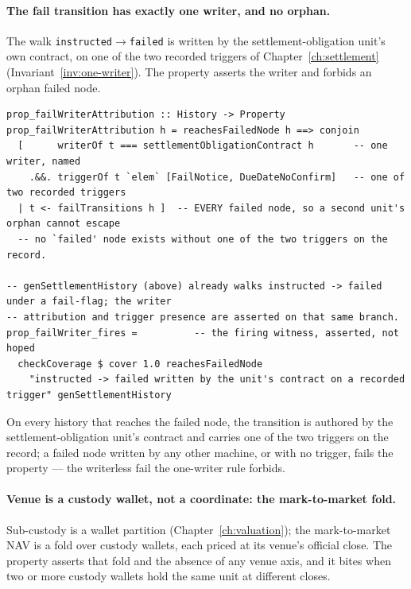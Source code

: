 \documentclass[11pt,a4paper]{article}
\begin{document}
\paragraph{The fail transition has exactly one writer, and no orphan.}
The walk \texttt{instructed}$\to$\texttt{failed} is written by the settlement-obligation unit's
own contract, on one of the two recorded triggers of Chapter~\ref{ch:settlement}
(Invariant~\ref{inv:one-writer}). The property asserts the writer and forbids an orphan
failed node.

\begin{lstlisting}
prop_failWriterAttribution :: History -> Property
prop_failWriterAttribution h = reachesFailedNode h ==> conjoin
  [      writerOf t === settlementObligationContract h       -- one writer, named
    .&&. triggerOf t `elem` [FailNotice, DueDateNoConfirm]   -- one of two recorded triggers
  | t <- failTransitions h ]  -- EVERY failed node, so a second unit's orphan cannot escape
  -- no `failed' node exists without one of the two triggers on the record.

-- genSettlementHistory (above) already walks instructed -> failed under a fail-flag; the writer
-- attribution and trigger presence are asserted on that same branch.
prop_failWriter_fires =          -- the firing witness, asserted, not hoped
  checkCoverage $ cover 1.0 reachesFailedNode
    "instructed -> failed written by the unit's contract on a recorded trigger" genSettlementHistory
\end{lstlisting}

On every history that reaches the failed node, the transition is authored by the
settlement-obligation unit's contract and carries one of the two triggers on the record; a failed
node written by any other machine, or with no trigger, fails the property --- the writerless fail the
one-writer rule forbids.

\paragraph{Venue is a custody wallet, not a coordinate: the mark-to-market fold.}
Sub-custody is a wallet partition (Chapter~\ref{ch:valuation}); the mark-to-market NAV is a
fold over custody wallets, each priced at its venue's official close. The property asserts
that fold and the absence of any venue axis, and it bites when two or more custody wallets
hold the same unit at different closes.
\end{document}
